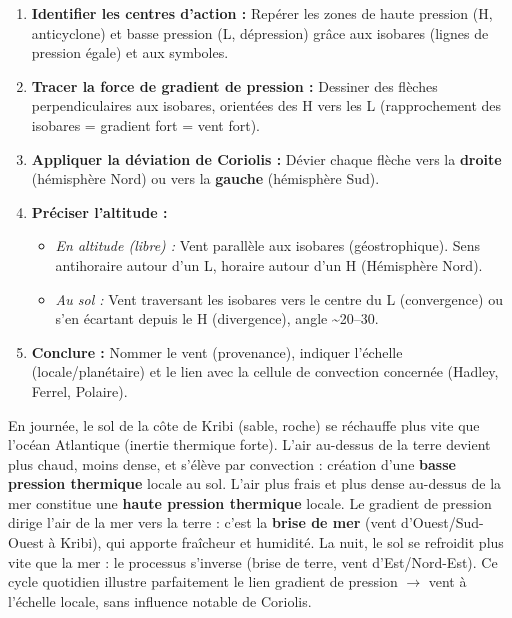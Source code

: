 \documentclass[11pt]{article}
\newcounter{popsec}
\newcounter{popsub}
\newcommand{\courssub}[1]{%
  \stepcounter{popsub}%
  \par\vspace{9pt}\noindent{\popxbold\fontsize{11.5}{13}\selectfont\color{popink}{\color{poporange}\thepopsec.\thepopsub}\hspace{6pt}#1}\par\nopagebreak\vspace{4pt}
}
\begin{document}
\begin{methode}
\begin{enumerate}
  \item \textbf{Identifier les centres d'action :} Repérer les zones de haute pression (H, anticyclone) et basse pression (L, dépression) grâce aux isobares (lignes de pression égale) et aux symboles.
  \item \textbf{Tracer la force de gradient de pression :} Dessiner des flèches perpendiculaires aux isobares, orientées des H vers les L (rapprochement des isobares = gradient fort = vent fort).
  \item \textbf{Appliquer la déviation de Coriolis :} Dévier chaque flèche vers la \textbf{droite} (hémisphère Nord) ou vers la \textbf{gauche} (hémisphère Sud).
  \item \textbf{Préciser l'altitude :}
        \begin{itemize}
          \item \textit{En altitude (libre) :} Vent parallèle aux isobares (géostrophique). Sens antihoraire autour d'un L, horaire autour d'un H (Hémisphère Nord).
          \item \textit{Au sol :} Vent traversant les isobares vers le centre du L (convergence) ou s'en écartant depuis le H (divergence), angle \textasciitilde 20\textdegree--30\textdegree.
        \end{itemize}
  \item \textbf{Conclure :} Nommer le vent (provenance), indiquer l'échelle (locale/planétaire) et le lien avec la cellule de convection concernée (Hadley, Ferrel, Polaire).
\end{enumerate}
\end{methode}

\courssub{Exemple concret : brise de mer à Kribi}

\begin{exemplebox}
En journée, le sol de la côte de Kribi (sable, roche) se réchauffe plus vite que l'océan Atlantique (inertie thermique forte). L'air au-dessus de la terre devient plus chaud, moins dense, et s'élève par convection : création d'une \textbf{basse pression thermique} locale au sol. L'air plus frais et plus dense au-dessus de la mer constitue une \textbf{haute pression thermique} locale. Le gradient de pression dirige l'air de la mer vers la terre : c'est la \textbf{brise de mer} (vent d'Ouest/Sud-Ouest à Kribi), qui apporte fraîcheur et humidité. La nuit, le sol se refroidit plus vite que la mer : le processus s'inverse (brise de terre, vent d'Est/Nord-Est). Ce cycle quotidien illustre parfaitement le lien \og gradient de pression $\rightarrow$ vent \fg à l'échelle locale, sans influence notable de Coriolis.
\end{exemplebox}
\end{document}
